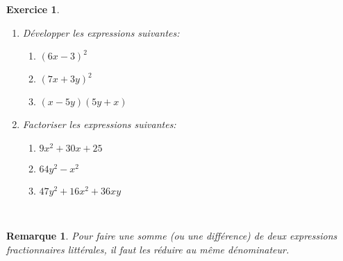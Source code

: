 \documentclass[a4paper,10pt]{article}
\newtheorem{rmq}{Remarque}
\newtheorem{exer}{Exercice}
\begin{document}
\begin{exer}\hfil\\
\begin{enumerate}
\item Développer les expressions suivantes:\\
\begin{enumerate}[$\square$]
\item $(6x-3)^2$\dotfill \\
\item $(7x+3y)^2$\dotfill \\
\item$(x-5y)(5y+x)$\dotfill \\
\end{enumerate}
\item Factoriser les expressions suivantes:\\
\begin{enumerate}[$\square$]
\item $9x^2+30x+25$\dotfill \\
\item $64y^2-x^2$\dotfill \\
\item$47y^2+16x^2+36xy$\dotfill \\
\end{enumerate}
\end{enumerate}
\end{exer}
\hfill\\
\begin{rmq}
Pour faire une somme (ou une différence) de deux expressions fractionnaires littérales, il faut les réduire au même dénominateur.
\end{rmq}
\hfill \\
\end{document}
